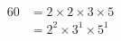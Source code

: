 \documentclass[preview]{standalone}
\begin{document}
\begin{align*}
60 &= 2 \times 2 \times 3 \times 5 \\ &= 2^2 \times 3^1 \times 5^1
\end{align*}
\end{document}
